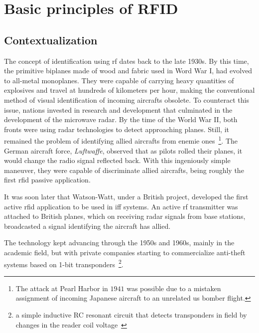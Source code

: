 \chapter{Basic principles of RFID}

\section{Contextualization} \label{sec:contextualization}

The concept of identification using \ac{rf} dates back to the late 1930s.
By this time, the primitive biplanes made of wood and fabric used in Word War I, had evolved to all-metal monoplanes. They were capable of carrying heavy quantities of explosives and travel at hundreds of kilometers per hour, making the conventional method of visual identification of incoming aircrafts obsolete.
To counteract this issue, nations invested in research and development that culminated in the development of the microwave radar.
By the time of the World War II, both fronts were using radar technologies to detect approaching planes. 
Still, it remained the problem of identifying allied aircrafts from enemie ones~\footnote{The attack at Pearl Harbor in $1941$ was possible due to a mistaken assignment of incoming Japanese aircraft to an unrelated \ac{us} bomber flight.}.
The German aircraft force, \emph{Luftwaffe}, observed that as pilots rolled their planes, it would change the radio signal reflected back. With this ingeniously simple maneuver, they were capable of discriminate allied aircrafts, being roughly the first \ac{rfid} passive application.~\cite{dobkinRFRFIDSecond2012}

It was soon later that Watson-Watt, under a British project, developed the first active \ac{rfid} application to be used in \ac{iff} systems. An active \ac{rf} transmitter was attached to British planes, which on receiving radar signals from base stations, broadcasted a signal identifying the aircraft has allied.~\cite{HistoryRFIDTechnology}


The technology kept advancing through the 1950s and 1960s, mainly in the academic field, but with private companies starting to commercialize anti-theft systems based on 1-bit transponders~\footnote{a simple inductive RC resonant circuit that detects transponders in field by changes in the reader coil voltage~\cite{andreventuradacruzmarnotozuqueteIdentificacaoPorRFID2018}}.

